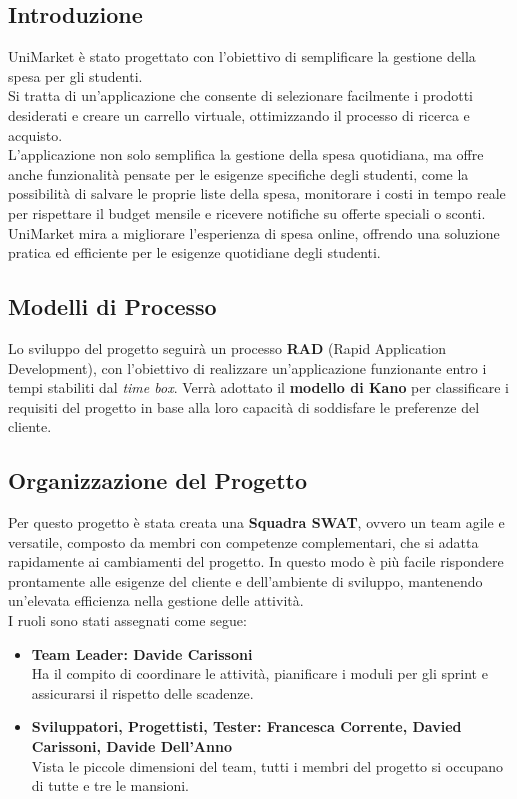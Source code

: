 \documentclass[a4paper,12pt]{article}
\begin{document}
\subsection{Introduzione} %
UniMarket è stato progettato con l'obiettivo di semplificare la gestione della spesa per gli studenti.\\  
Si tratta di un'applicazione che consente di selezionare facilmente i prodotti desiderati e creare un carrello virtuale, ottimizzando il processo di ricerca e acquisto. \\
L'applicazione non solo semplifica la gestione della spesa quotidiana, ma offre anche funzionalità pensate per le esigenze specifiche degli studenti, come la possibilità di salvare le proprie liste della spesa, monitorare i costi in tempo reale per rispettare il budget mensile e ricevere notifiche su offerte speciali o sconti. \\
UniMarket mira a migliorare l'esperienza di spesa online, offrendo una soluzione pratica ed efficiente per le esigenze quotidiane degli studenti.

\subsection{Modelli di Processo} %
Lo sviluppo del progetto seguirà un processo \textbf{RAD} (Rapid Application Development), con l’obiettivo di realizzare un’applicazione funzionante entro i tempi stabiliti dal \textit{time box}.  
Verrà adottato il \textbf{modello di Kano} per classificare i requisiti del progetto in base alla loro capacità di soddisfare le preferenze del cliente.


\subsection{Organizzazione del Progetto} %
Per questo progetto è stata creata una \textbf{Squadra SWAT}, ovvero un team agile e versatile, composto da membri con competenze complementari, che si adatta 
rapidamente ai cambiamenti del progetto. In questo modo è più facile rispondere prontamente alle esigenze del cliente e dell’ambiente di sviluppo, 
mantenendo un'elevata efficienza nella gestione delle attività. \\
I ruoli sono stati assegnati come segue: 
\begin{itemize}
    \item \textbf{Team Leader: Davide Carissoni} \\
    Ha il compito di coordinare le attività, pianificare i moduli per gli sprint e assicurarsi il rispetto delle scadenze. 
    \item \textbf{Sviluppatori, Progettisti, Tester: Francesca Corrente, Davied Carissoni, Davide Dell'Anno} \\
    Vista le piccole dimensioni del team, tutti i membri del progetto si occupano di tutte e tre le mansioni.
\end{itemize}
\end{document}
